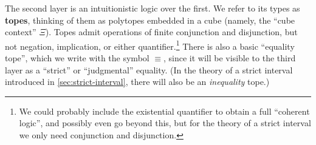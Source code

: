 \documentclass{amsart}
\theoremstyle{plain}
\theoremstyle{definition}
\theoremstyle{remark}
\numberwithin{equation}{section}
\newcommand{\jdeq}{\equiv}
\newcommand{\types}{\vdash}
\newcommand{\tope}{\;\mathsf{tope}}
\begin{document}
The second layer is an intuitionistic logic over the first.
We refer to its types as \textbf{topes}, thinking of them as polytopes embedded in a cube (namely, the ``cube context'' $\Xi$).
Topes admit operations of finite conjunction and disjunction, but not negation, implication, or either quantifier.\footnote{We could probably include the existential quantifier to obtain a full ``coherent logic'', and possibly even go beyond this, but for the theory of a strict interval we only need conjunction and disjunction.}
There is also a basic ``equality tope'', which we write with the symbol $\jdeq$, since it will be visible to the third layer as a ``strict'' or ``judgmental'' equality.
(In the theory of a strict interval introduced in \cref{sec:strict-interval}, there will also be an \emph{inequality} tope.)

\begin{figure}
  \centering
\end{figure}
\end{document}
